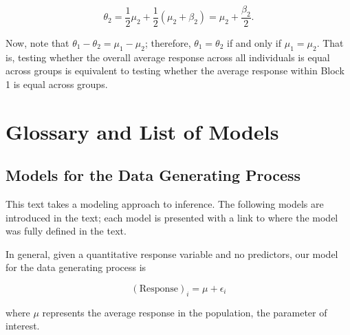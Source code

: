\documentclass[
  letterpaper,
  DIV=11,
  numbers=noendperiod]{scrreprt}
\theoremstyle{plain}
\theoremstyle{definition}
\theoremstyle{definition}
\theoremstyle{remark}
\begin{document}
\[\theta_2 = \frac{1}{2} \mu_2 + \frac{1}{2} \left(\mu_2 + \beta_2\right) = \mu_2 + \frac{\beta_2}{2}.\]

Now, note that \(\theta_1 - \theta_2 = \mu_1 - \mu_2\); therefore,
\(\theta_1 = \theta_2\) if and only if \(\mu_1 = \mu_2\). That is,
testing whether the overall average response across all individuals is
equal across groups is equivalent to testing whether the average
response within Block 1 is equal across groups.

\hypertarget{glossary-and-list-of-models}{%
\chapter{Glossary and List of
Models}\label{glossary-and-list-of-models}}

\hypertarget{models-for-the-data-generating-process}{%
\section{Models for the Data Generating
Process}\label{models-for-the-data-generating-process}}

This text takes a modeling approach to inference. The following models
are introduced in the text; each model is presented with a link to where
the model was fully defined in the text.

\begin{tcolorbox}[enhanced jigsaw, breakable, colback=white, arc=.35mm, coltitle=black, bottomtitle=1mm, titlerule=0mm, colbacktitle=quarto-callout-important-color!10!white, title=\textcolor{quarto-callout-important-color}{\faExclamation}\hspace{0.5em}{Data Generating Process for Single Mean Response
(Equation~\ref{eq-single-mean})}, left=2mm, opacityback=0, opacitybacktitle=0.6, colframe=quarto-callout-important-color-frame, toptitle=1mm, toprule=.15mm, rightrule=.15mm, bottomrule=.15mm, leftrule=.75mm]

In general, given a quantitative response variable and no predictors,
our model for the data generating process is

\[(\text{Response})_i = \mu + \epsilon_i\]

where \(\mu\) represents the average response in the population, the
parameter of interest.

\end{tcolorbox}
\end{document}
